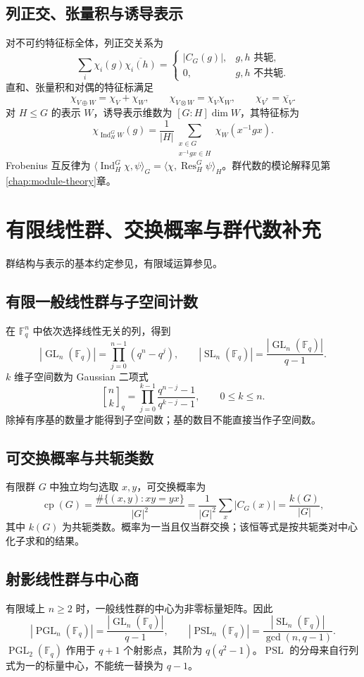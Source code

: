 \documentclass[../main.tex]{subfiles}
\begin{document}
\subsection{列正交、张量积与诱导表示}
对不可约特征标全体，列正交关系为
\[
\sum_i\chi_i(g)\overline{\chi_i(h)}=
\begin{cases}|C_G(g)|,&g,h\text{ 共轭},\\0,&g,h\text{ 不共轭}.\end{cases}
\]
直和、张量积和对偶的特征标满足
\[
\chi_{V\oplus W}=\chi_V+\chi_W,\qquad
\chi_{V\otimes W}=\chi_V\chi_W,\qquad
\chi_{V^*}=\overline{\chi_V}.
\]
对 $H\le G$ 的表示 $W$，诱导表示维数为 $[G:H]\dim W$，其特征标为
\[
\chi_{\operatorname{Ind}_H^G W}(g)=\frac1{|H|}
\sum_{\substack{x\in G\\x^{-1}gx\in H}}\chi_W(x^{-1}gx).
\]
Frobenius 互反律为 $\langle\operatorname{Ind}_H^G\chi,\psi\rangle_G=\langle\chi,\operatorname{Res}_H^G\psi\rangle_H$。群代数的模论解释见第\ref{chap:module-theory}章。
\section{有限线性群、交换概率与群代数补充}
群结构与表示的基本约定参见\cite{milneGT}，有限域运算参见\cite{shoup}。
\subsection{有限一般线性群与子空间计数}
在 $\mathbb F_q^n$ 中依次选择线性无关的列，得到
\[
|\operatorname{GL}_n(\mathbb F_q)|=\prod_{j=0}^{n-1}(q^n-q^j),\qquad
|\operatorname{SL}_n(\mathbb F_q)|=\frac{|\operatorname{GL}_n(\mathbb F_q)|}{q-1}.
\]
$k$ 维子空间数为 Gaussian 二项式
\[
{n\brack k}_q=\prod_{j=0}^{k-1}\frac{q^{n-j}-1}{q^{k-j}-1},\qquad0\le k\le n.
\]
除掉有序基的数量才能得到子空间数；基的数目不能直接当作子空间数。
\subsection{可交换概率与共轭类数}
有限群 $G$ 中独立均匀选取 $x,y$，可交换概率为
\[
\operatorname{cp}(G)=\frac{\#\{(x,y):xy=yx\}}{|G|^2}
=\frac1{|G|^2}\sum_x|C_G(x)|=\frac{k(G)}{|G|},
\]
其中 $k(G)$ 为共轭类数。概率为一当且仅当群交换；该恒等式是按共轭类对中心化子求和的结果。
\subsection{射影线性群与中心商}
有限域上 $n\ge2$ 时，一般线性群的中心为非零标量矩阵。因此
\[
|\operatorname{PGL}_n(\mathbb F_q)|=\frac{|\operatorname{GL}_n(\mathbb F_q)|}{q-1},\qquad
|\operatorname{PSL}_n(\mathbb F_q)|=\frac{|\operatorname{SL}_n(\mathbb F_q)|}{\gcd(n,q-1)}.
\]
$\operatorname{PGL}_2(\mathbb F_q)$ 作用于 $q+1$ 个射影点，其阶为 $q(q^2-1)$。$\operatorname{PSL}$ 的分母来自行列式为一的标量中心，不能统一替换为 $q-1$。
\end{document}
